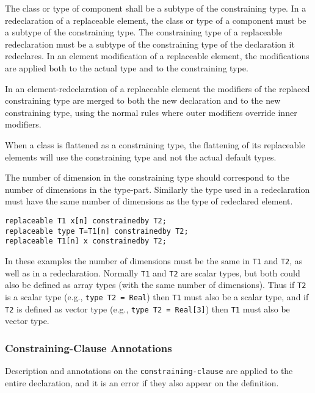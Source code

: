 The class or type of component shall be a subtype of the constraining type.
In a redeclaration of a replaceable element, the class or type of a component must be a subtype of the constraining type.
The constraining type of a replaceable redeclaration must be a subtype of the constraining type of the declaration it redeclares.
In an element modification of a replaceable element, the modifications are applied both to the actual type and to the constraining type.

In an element-redeclaration of a replaceable element the modifiers of the replaced constraining type are merged to both the new declaration and to the new constraining type, using the normal rules where outer modifiers override inner modifiers.

When a class is flattened as a constraining type, the flattening of its replaceable elements will use the constraining type and not the actual default types.

The number of dimension in the constraining type should correspond to the number of dimensions in the type-part.
Similarly the type used in a redeclaration must have the same number of dimensions as the type of redeclared element.

\begin{example}
\begin{lstlisting}[language=modelica]
replaceable T1 x[n] constrainedby T2;
replaceable type T=T1[n] constrainedby T2;
replaceable T1[n] x constrainedby T2;
\end{lstlisting}
In these examples the number of dimensions must be the same in \lstinline!T1! and \lstinline!T2!, as well as in a redeclaration.
Normally \lstinline!T1! and \lstinline!T2! are scalar types, but both could also be defined as array types (with the same number of dimensions).
Thus if \lstinline!T2! is a scalar type (e.g., \lstinline!type T2 = Real!) then \lstinline!T1! must also be a scalar type, and if \lstinline!T2! is defined as vector type (e.g., \lstinline!type T2 = Real[3]!) then \lstinline!T1! must also be vector type.
\end{example}

\subsubsection{Constraining-Clause Annotations}\label{constraining-clause-annotations}

Description and annotations on the \lstinline[language=grammar]!constraining-clause! are applied to the entire declaration, and it is an error if they also appear on the definition.

